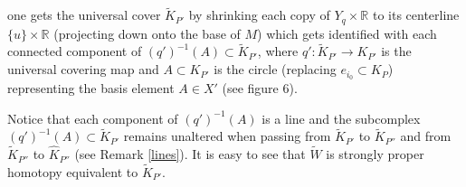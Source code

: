 \documentclass{amsart}[12pt]
\theoremstyle{definition}
\theoremstyle{remark}
\numberwithin{equation}{section}
\begin{document}
one gets the universal cover $\widetilde{K}_{P'}$ by shrinking
each copy of $Y_q \times {\mathbb R}$ to its centerline $\{u\} \times
{\mathbb R}$ (projecting down onto the base of $M$) which gets identified
with each connected component of $(q')^{-1}(A) {\subset}
\widetilde{K}_{P'}$, where $q' : \widetilde{K}_{P'} {\longrightarrow} K_{P'}$
is the universal covering map and $A {\subset} K_{P'}$ is the circle
(replacing $e_{i_0} {\subset} K_P$) representing the basis element $A
\in X'$ (see figure 6).
\begin{figure}
\centerline{}
\vspace{-10mm} \label{figure6} \caption{}
\end{figure}
Notice that each component of $(q')^{-1}(A)$ is a line and the
subcomplex $(q')^{-1}(A) {\subset} \widetilde{K}_{P'}$ remains
unaltered when passing from $\widetilde{K}_{P'}$ to
$\widetilde{K}_{P''}$ and from $\widetilde{K}_{P''}$ to
$\widehat{K}_{P''}$ (see Remark \ref{lines}). It is easy to see
that
$\widetilde{W}$ is strongly proper homotopy equivalent to $\widetilde{K}_{P'}$.\\
\end{document}
